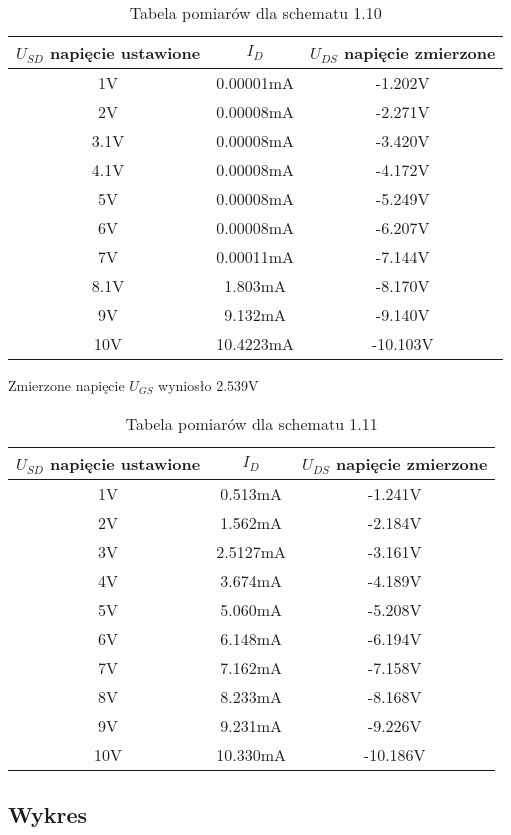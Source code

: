 \documentclass[polish,a4paper]{article}
\begin{document}
\begin{table}[H]
\centering
\begin{tabular}{|c|c|c|}
\hline
$U_{SD}$ napięcie ustawione & $I_{D}  $ & $U_{DS}$ napięcie zmierzone \\
\hline 
1V & 0.00001mA & -1.202V \\
\hline
2V & 0.00008mA & -2.271V \\
\hline
3.1V & 0.00008mA & -3.420V\\
\hline
4.1V & 0.00008mA & -4.172V\\
\hline
5V & 0.00008mA & -5.249V\\
\hline
6V & 0.00008mA & -6.207V\\
\hline
7V & 0.00011mA & -7.144V\\
\hline
8.1V & 1.803mA & -8.170V\\
\hline
9V & 9.132mA & -9.140V\\
\hline
10V & 10.4223mA & -10.103V\\
\hline


\end{tabular}
\caption{Tabela pomiarów dla schematu 1.10}
\end{table}

Zmierzone napięcie $U_{GS}$ wyniosło 2.539V

\begin{table}[H]
\centering
\begin{tabular}{|c|c|c|}
\hline
$U_{SD}$ napięcie ustawione & $I_{D}  $ & $U_{DS}$ napięcie zmierzone \\
\hline 
1V & 0.513mA & -1.241V \\
\hline
2V & 1.562mA & -2.184V \\
\hline
3V & 2.5127mA & -3.161V\\
\hline
4V & 3.674mA & -4.189V\\
\hline
5V & 5.060mA & -5.208V\\
\hline
6V & 6.148mA & -6.194V\\
\hline
7V & 7.162mA & -7.158V\\
\hline
8V & 8.233mA & -8.168V\\
\hline
9V & 9.231mA & -9.226V\\
\hline
10V & 10.330mA & -10.186V\\
\hline


\end{tabular}
\caption{Tabela pomiarów dla schematu 1.11}
\end{table}

\subsection{Wykres}
\end{document}
